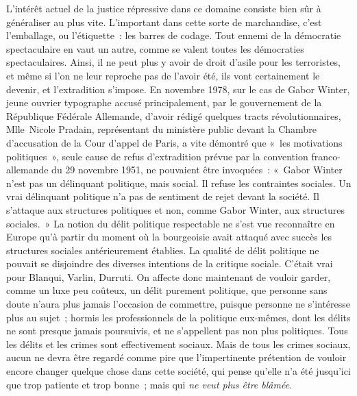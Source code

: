 \documentclass[french,twoside]{book} %
\def\bignobreak{\ifdim\lastskip<\bigskipamount
  \removelastskip\nopagebreak\bigskip\fi}
\newcommand{\labelblock}[1]{\bigbreak{\color{rubric}\noindent\textbf{#1}\par}\bignobreak}
\begin{document}
L’intérêt actuel de la justice répressive dans ce domaine consiste bien sûr à généraliser au plus vite. L’important dans cette sorte de marchandise, c’est l’emballage, ou l’étiquette : les barres de codage. Tout ennemi de la démocratie spectaculaire en vaut un autre, comme se valent toutes les démocraties spectaculaires. Ainsi, il ne peut plus y avoir de droit d’asile pour les terroristes, et même si l’on ne leur reproche pas de l’avoir été, ils vont certainement le devenir, et l’extradition s’impose. En novembre 1978, sur le cas de Gabor Winter, jeune ouvrier typographe accusé principalement, par le gouvernement de la République Fédérale Allemande, d’avoir rédigé quelques tracts révolutionnaires, Mlle Nicole Pradain, représentant du ministère public devant la Chambre d’accusation de la Cour d’appel de Paris, a vite démontré que « les motivations politiques », seule cause de refus d’extradition prévue par la convention franco-allemande du 29 novembre 1951, ne pouvaient être invoquées : « Gabor Winter n’est pas un délinquant politique, mais social. Il refuse les contraintes sociales. Un vrai délinquant politique n’a pas de sentiment de rejet devant la société. Il s’attaque aux structures politiques et non, comme Gabor Winter, aux structures sociales. » La notion du délit politique respectable ne s’est vue reconnaître en Europe qu’à partir du moment où la bourgeoisie avait attaqué avec succès les structures sociales antérieurement établies. La qualité de délit politique ne pouvait se disjoindre des diverses intentions de la critique sociale. C’était vrai pour Blanqui, Varlin, Durruti. On affecte donc maintenant de vouloir garder, comme un luxe peu coûteux, un délit purement politique, que personne sans doute n’aura plus jamais l’occasion de commettre, puisque personne ne s’intéresse plus au sujet ; hormis les professionnels de la politique eux-mêmes, dont les délits ne sont presque jamais poursuivis, et ne s’appellent pas non plus politiques. Tous les délits et les crimes sont effectivement sociaux. Mais de tous les crimes sociaux, aucun ne devra être regardé comme pire que l’impertinente prétention de vouloir encore changer quelque chose dans cette société, qui pense qu’elle n’a été jusqu’ici que trop patiente et trop bonne ; mais qui \emph{ne veut plus être blâmée}.\par

\labelblock{X}
\end{document}
